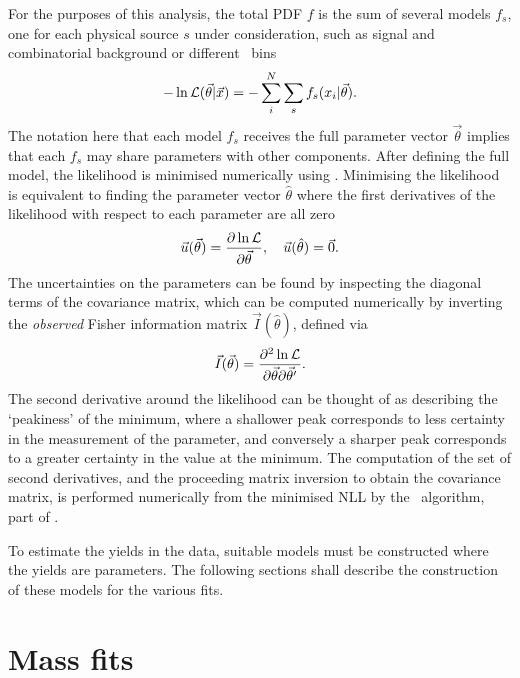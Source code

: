 For the purposes of this analysis, the total \ac{PDF} $f$ is the sum of several 
models $f_{s}$, one for each physical source $s$ under consideration, such as 
signal and combinatorial background or different \pTy\ bins
\begin{equation}
  -\ln{\ensuremath{\mathcal{L}}(\vec{\theta}|\vec{x})} =
  -\sum_{i}^{N} \sum_{s} f_{s}(x_{i}|\vec{\theta}).
\end{equation}
The notation here that each model $f_{s}$ receives the full parameter vector 
$\vec{\theta}$ implies that each $f_{s}$ may share parameters with other 
components.
After defining the full model, the likelihood is minimised numerically using 
\minuit.
Minimising the likelihood is equivalent to finding the parameter vector 
$\hat{\theta}$ where the first derivatives of the likelihood with respect to 
each parameter are all zero
\begin{equation}
  \vec{u}(\vec{\theta}) = \frac{%
    \partial\ln{\likelihood}
  }{%
    \partial\vec{\theta}
  },\quad
  \vec{u}(\hat{\theta}) = \vec{0}.
\end{equation}
The uncertainties on the parameters can be found by inspecting the diagonal 
terms of the covariance matrix, which can be computed numerically by inverting 
the \emph{observed} Fisher information matrix $\vec{I}(\hat{\theta})$, defined 
via
\begin{equation}
  \vec{I}(\vec{\theta}) = \frac{%
    \partial^{2}\ln{\likelihood}
  }{%
    \partial\vec{\theta}\partial\vec{\theta}'
  }.
\end{equation}
The second derivative around the likelihood can be thought of as describing the 
`peakiness' of the minimum, where a shallower peak corresponds to less 
certainty in the measurement of the parameter, and conversely a sharper peak 
corresponds to a greater certainty in the value at the minimum.
The computation of the set of second derivatives, and the proceeding matrix 
inversion to obtain the covariance matrix, is performed numerically from the 
minimised \ac{NLL} by the \hesse\ algorithm, part of \minuit.

To estimate the yields in the data, suitable models must be constructed where 
the yields are parameters.
The following sections shall describe the construction of these models for the 
various fits.

\section{Mass fits}
\label{chap:prod:fitting:mass}

